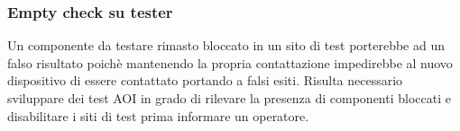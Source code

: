 \subsubsection{Empty check su tester}
Un componente da testare rimasto bloccato in un sito di test porterebbe ad un falso risultato poichè
mantenendo la propria contattazione impedirebbe al nuovo dispositivo di essere contattato portando a falsi esiti. Risulta  necessario sviluppare dei test AOI in grado di rilevare la presenza di componenti bloccati e disabilitare i siti di test prima informare un operatore.

\endinput